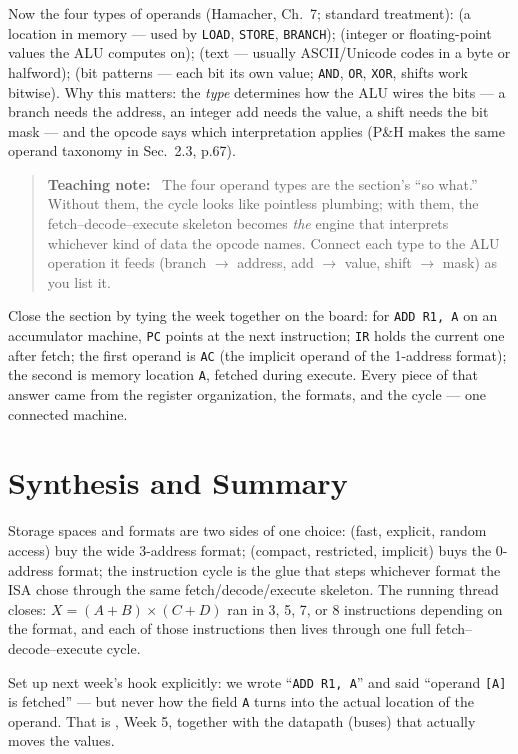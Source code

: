 \documentclass[11pt]{article}
\newenvironment{teachingaside}{\begin{quote}\small\color{primary-gold}\textbf{Teaching note:}\ }{\end{quote}}
\begin{document}
Now the four types of operands (Hamacher, Ch.~7; standard treatment):  (a location in memory --- used by \texttt{LOAD}, \texttt{STORE}, \texttt{BRANCH});  (integer or floating-point values the ALU computes on);  (text --- usually ASCII/Unicode codes in a byte or halfword);  (bit patterns --- each bit its own value; \texttt{AND}, \texttt{OR}, \texttt{XOR}, shifts work bitwise). Why this matters: the \emph{type} determines how the ALU wires the bits --- a branch needs the address, an integer add needs the value, a shift needs the bit mask --- and the opcode says which interpretation applies (P\&H makes the same operand taxonomy in Sec.~2.3, p.67).

\begin{teachingaside}
The four operand types are the section's ``so what.'' Without them, the cycle looks like pointless plumbing; with them, the fetch--decode--execute skeleton becomes \emph{the} engine that interprets whichever kind of data the opcode names. Connect each type to the ALU operation it feeds (branch $\to$ address, add $\to$ value, shift $\to$ mask) as you list it.
\end{teachingaside}

Close the section by tying the week together on the board: for \texttt{ADD R1, A} on an accumulator machine, \texttt{PC} points at the next instruction; \texttt{IR} holds the current one after fetch; the first operand is \texttt{AC} (the implicit operand of the 1-address format); the second is memory location \texttt{A}, fetched during execute. Every piece of that answer came from the register organization, the formats, and the cycle --- one connected machine.

\section{Synthesis and Summary}

Storage spaces and formats are two sides of one choice:  (fast, explicit, random access) buy the wide 3-address format;  (compact, restricted, implicit) buys the 0-address format; the instruction cycle is the glue that steps whichever format the ISA chose through the same fetch/decode/execute skeleton. The running thread closes: $X = (A+B)\times(C+D)$ ran in 3, 5, 7, or 8 instructions depending on the format, and each of those instructions then lives through one full fetch--decode--execute cycle.

Set up next week's hook explicitly: we wrote ``\texttt{ADD R1, A}'' and said ``operand \texttt{[A]} is fetched'' --- but never how the field \texttt{A} turns into the actual location of the operand. That is , Week 5, together with the datapath (buses) that actually moves the values.
\end{document}
